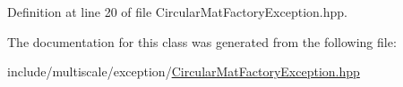 Definition at line 20 of file Circular\-Mat\-Factory\-Exception.\-hpp.



The documentation for this class was generated from the following file\-:\begin{DoxyCompactItemize}
\item 
include/multiscale/exception/\hyperlink{CircularMatFactoryException_8hpp}{Circular\-Mat\-Factory\-Exception.\-hpp}\end{DoxyCompactItemize}
